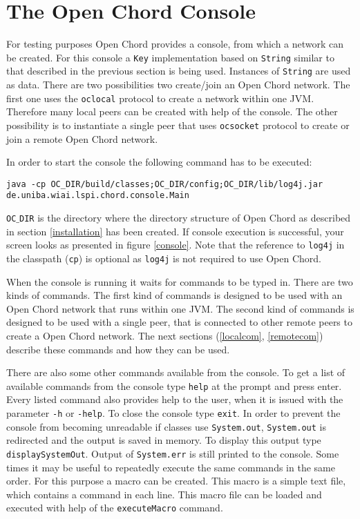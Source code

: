 \section{The Open Chord Console}\label{sectionconsole}

For testing purposes Open Chord provides a console, from which a network can be 
created. For this console a {\tt Key} implementation based on {\tt String} similar 
to that described in the previous section is being used. Instances of
{\tt String} are used as data. There are two 
possibilities two create/join an Open Chord network. The first one uses the 
{\tt oclocal} protocol to create a network within one JVM. Therefore many local peers 
can be created with help of the console. The other possibility is to instantiate 
a single peer that uses {\tt ocsocket} protocol to create or join a remote 
Open Chord network. 

In order to start the console the following command has to be executed:  
\begin{verbatim}
java -cp OC_DIR/build/classes;OC_DIR/config;OC_DIR/lib/log4j.jar 
de.uniba.wiai.lspi.chord.console.Main
\end{verbatim}
{\tt OC$\_$DIR} is the directory where the directory structure of Open Chord 
as described in section \ref{installation} has been created. If console 
execution is successful, your screen looks as presented in figure \ref{console}. 
Note that the reference to {\tt log4j} in the classpath ({\tt cp}) is optional 
as {\tt log4j} is not required to use Open Chord.  


When the console is running it waits for commands to be typed in. There are 
two kinds of commands. The first kind of commands is designed to be used 
with an Open Chord network that runs within one JVM. The second kind of 
commands is designed to be used with a single peer, that is connected to 
other remote peers to create a Open Chord network. 
The next sections (\ref{localcom}, \ref{remotecom}) describe these 
commands and how they can be used. 

There are also some other commands available from the console. 
To get a list of available commands from the console type {\tt help} at 
the prompt and press enter. Every listed command also provides help 
to the user, when it is issued with the parameter {\tt -h} or {\tt -help}. 
To close the console type {\tt exit}. 
In order to prevent the console from becoming unreadable if classes use 
{\tt System.out}, {\tt System.out} is redirected and the output is saved in 
memory. To display this output type {\tt displaySystemOut}. Output of 
{\tt System.err} is still printed to the console. 
Some times it may be useful to repeatedly execute the same commands in the same 
order. For this purpose a macro can be created. This macro is a simple text file, 
which contains a command in each line. This macro file can be loaded and executed 
with help of the {\tt executeMacro} command. 

